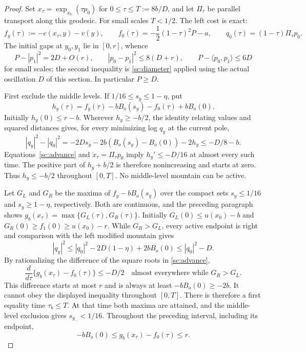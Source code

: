 \begin{proof}
Set $x_\tau=\exp_{x_0}(\tau p_0)$ for
$0\leq\tau\leq T:=8b/D$, and let $\Pi_\tau$ be parallel transport
along this geodesic.  For small scales $T<1/2$.  The left cost is exact:
\[
 f_y(\tau):=-c(x_\tau,y)-v(y),\qquad
 f_0(\tau)=-\frac12(1-\tau)^2P-a,\qquad
 q_0(\tau)=(1-\tau)\Pi_\tau p_0.
\]
The initial gaps at $y_0,y_1$ lie in $[0,r]$, whence
\begin{equation}
 P-|p_1|^2=2D+O(r),\qquad
 |p_0-p_1|^2\leq8(D+r),\qquad
 P-\langle p_0,p_1\rangle\leq6D
 \label{sc:initial-logs}
\end{equation}
for small scales; the second inequality is \eqref{sc:diameter}
applied using the actual oscillation $D$ of this section.
In particular $P\geq D$.

First exclude the middle levels.  If $1/16\leq s_y\leq1-\eta$, put
\[
 h_y(\tau)=f_y(\tau)-bB_o(s_y)
                -f_0(\tau)+bB_o(0).
\]
Initially $h_y(0)\leq r-b$.  Wherever $h_y\geq-b/2$, the identity
relating values and squared distances gives, for every minimizing
log $q_y$ at the current pole,
\[
 |q_y|^2-|q_0|^2
   =-2Ds_y-2b(B_o(s_y)-B_o(0))-2h_y
   \leq-D/8-b.
\]
Equations~\eqref{sc:advance} and $\dot x_\tau=\Pi_\tau p_0$ imply
$h_y'\leq-D/16$ at almost every such time.
The positive part of $h_y+b/2$ is therefore nonincreasing and starts
at zero.  Thus $h_y\leq-b/2$ throughout $[0,T]$.
No middle-level mountain can be active.

Let $G_L$ and $G_R$ be the maxima of $f_y-bB_o(s_y)$ over the compact
sets $s_y\leq1/16$ and $s_y\geq1-\eta$, respectively.
Both are continuous, and the preceding paragraph shows
$g_b(x_\tau)=\max\{G_L(\tau),G_R(\tau)\}$.
Initially $G_L(0)\leq u(x_0)-b$ and
$G_R(0)\geq f_1(0)\geq u(x_0)-r$.
While $G_R>G_L$, every active endpoint is right and comparison with
the left modified mountain gives
\[
 |q_y|^2\leq|q_0|^2-2D(1-\eta)+2bB_o(0)
             \leq|q_0|^2-D.
\]
By rationalizing the difference of the square roots in
\eqref{sc:advance},
\[
 \frac d{d\tau}\{g_b(x_\tau)-f_0(\tau)\}\leq-D/2
 \quad\text{almost everywhere while }G_R>G_L.
\]
This difference starts at most $r$ and is always at least
$-bB_o(0)\geq-2b$.  It cannot obey the displayed inequality throughout
$[0,T]$.  There is therefore a first equality time $\tau_b\leq T$.
At that time both maxima are attained, and the middle-level exclusion
gives $s_{y_-}<1/16$.
Throughout the preceding interval, including its endpoint,
\begin{equation}
 -bB_o(0)\leq g_b(x_\tau)-f_0(\tau)\leq r.
 \label{sc:left-anchor}
\end{equation}


\end{proof}
